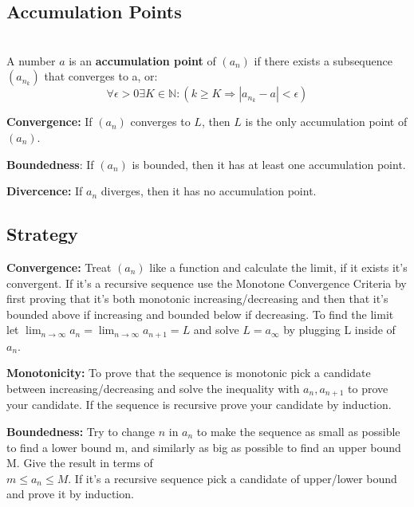 \documentclass[8pt,a4paper]{extarticle}     %
\theoremstyle{definition}
\theoremstyle{definition}
\theoremstyle{definition}
\newcommand{\N}{\mathbb{N}}
\begin{document}
\begin{multicols}{4}
\subsection{Accumulation Points}
\begin{boxdefinition}\ \\
	A number $a$ is an \textbf{accumulation point} of $(a_n)$ if there exists a subsequence $(a_{n_k})$ that converges to a, or:
	$$\forall\epsilon > 0 \exists K \in \N: (k\geq K \Rightarrow |a_{n_k} - a| < \epsilon)$$
\end{boxdefinition}
\begin{eqlist}
	\item \textbf{Convergence:} If $(a_n)$ converges to $L$, then $L$ is the only accumulation point of $(a_n)$.
	\item \textbf{Boundedness}: If $(a_n)$ is bounded, then it has at least one accumulation point.
	\item \textbf{Divercence:} If $a_n$ diverges, then it has no accumulation point.
\end{eqlist}


\subsection{Strategy}
\begin{bulletlist}
	\item \textbf{Convergence:} Treat $(a_n)$ like a function and calculate the limit, if it exists it's convergent. If it's a recursive sequence use the Monotone Convergence Criteria by first proving that it's both monotonic increasing/decreasing and then that it's bounded above if increasing and bounded below if decreasing. To find the limit let $\lim_{n\to\infty}a_n = \lim_{n\to\infty}a_{n+1} = L$ and solve $L = a_\infty$ by plugging L inside of $a_n$.
	\item \textbf{Monotonicity:} To prove that the sequence is monotonic pick a candidate between increasing/decreasing and solve the inequality with $a_n, a_{n+1}$ to prove your candidate. If the sequence is recursive prove your candidate by induction.
	\item \textbf{Boundedness:} Try to change $n$ in $a_n$ to make the sequence as small as possible to find a lower bound m, and similarly as big as possible to find an upper bound M. Give the result in terms of \\$m \leq a_n \leq M$.
	If it's a recursive sequence pick a candidate of upper/lower bound and prove it by induction.
\end{bulletlist}


\end{multicols}
\end{document}
